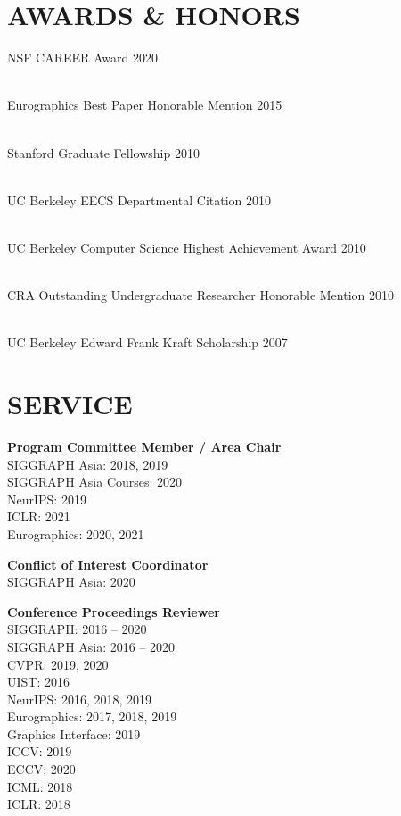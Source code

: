 \documentclass[line,margin]{res}
\begin{document}
\begin{resume}
\section{AWARDS \& HONORS}

\newcommand{\award}[2] {
	#1 \hfill #2
}

\award
{NSF CAREER Award}
{2020}
\\
\award
{Eurographics Best Paper Honorable Mention}
{2015}
\\
\award
{Stanford Graduate Fellowship}
{2010}
\\
\award
{UC Berkeley EECS Departmental Citation}
{2010}
\\
\award
{UC Berkeley Computer Science Highest Achievement Award}
{2010}
\\
\award
{CRA Outstanding Undergraduate Researcher Honorable Mention}
{2010}
\\
\award
{UC Berkeley Edward Frank Kraft Scholarship}
{2007}


\section{SERVICE}

\textbf{Program Committee Member / Area Chair}\\
SIGGRAPH Asia: 2018, 2019\\
SIGGRAPH Asia Courses: 2020\\
NeurIPS: 2019\\
ICLR: 2021\\
Eurographics: 2020, 2021

\textbf{Conflict of Interest Coordinator}\\
SIGGRAPH Asia: 2020

\textbf{Conference Proceedings Reviewer}\\
SIGGRAPH: 2016 -- 2020\\
SIGGRAPH Asia: 2016 -- 2020\\
CVPR: 2019, 2020\\
UIST: 2016\\
NeurIPS: 2016, 2018, 2019\\
Eurographics: 2017, 2018, 2019\\
Graphics Interface: 2019\\
ICCV: 2019\\
ECCV: 2020\\
ICML: 2018\\
ICLR: 2018


\end{resume}
\end{document}
